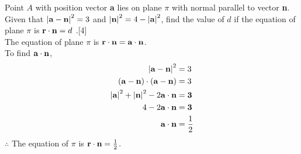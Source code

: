 \documentclass[12pt, a4 paper]{article}
\begin{document}
\begin{outline}[enumerate]
					\color{black}
					\1 Point $A$ with position vector \textbf{a} lies on plane $\pi $ with normal parallel to vector \textbf{n}. Given that ${\left| {{\bf{a}} - {\bf{n}}} \right|^2} = 3$ and ${\left| {\bf{n}} \right|^2} = 4 - {\left| {\bf{a}} \right|^2}$, find the value of $d$ if the equation of plane $\pi $ is ${\bf{r}} \cdot {\bf{n}} = d$
					.\hfill[4]
					\color{blue}
					\\{\textrm{The equation of plane }}$\pi$ {\textrm{ is }}${\bf{r}} \cdot {\bf{n}} = {\bf{a}} \cdot {\bf{n}}$.
					\\To find ${\bf{a}} \cdot {\bf{n}}$,
					\begin{align*}
						{\left| {{\bf{a}} - {\bf{n}}} \right|^2} & = 3 \\({\bf{a}} - {\bf{n}}) \cdot ({\bf{a}} - {\bf{n}}) &= 3\\{\left| {\bf{a}} \right|^2} + {\left| {\bf{n}} \right|^2} - 2{\bf{a}} \cdot {\bf{n}} &= {\bf{3}}\\4 - 2{\bf{a}} \cdot {\bf{n}} &= {\bf{3}}\\{\bf{a}} \cdot {\bf{n}} &= \frac{1}{2}
						\\
					\end{align*}
					$\therefore$ {\textrm{The equation of }}$\pi$ {\textrm{ is }}${\bf{r}} \cdot {\bf{n}} = \frac{1}{2}$.
															
					\color{black}
										

\end{outline}
\end{document}
